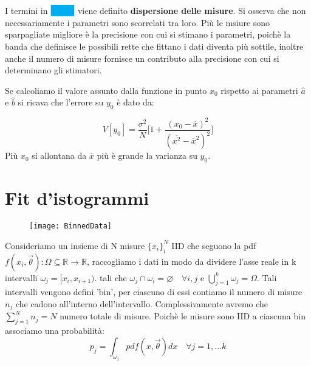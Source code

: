 I termini in $\colorbox{cyan}{\phantom{b = \,}}$ viene definito \textbf{dispersione delle misure}. Si osserva che non necessariamente i parametri sono scorrelati tra loro. Pi\`{u} le msiure sono sparpagliate migliore \`{e} la precisione con cui si stimano i parametri, poich\`{e} la banda che definisce le possibili rette che fittano i dati diventa pi\`{u} sottile, inoltre anche il numero di misure fornisce un contributo alla precisione con cui si determinano gli stimatori. \newline

\noindent Se calcoliamo il valore assunto dalla funzione in punto $x_0$ rispetto ai parametri $\hat{a}$ e $\hat{b}$ si ricava che l'errore su $y_0$ \`{e} dato da:

\begin{equation*}
	V[y_0] = \dfrac{\sigma^2}{N} \Big[ 1 + \dfrac{(x_0 - \overline{x})^2}{(\overline{x^2} - \overline{x}^2 )^2} \Big ]
\end{equation*}
Pi\`{u} $x_0$ si allontana da $\overline{x}$ pi\`{u} \`{e} grande la varianza su $y_0$.

\section{Fit d'istogrammi}
\begin{wrapfigure}{l}{0.\textwidth}
\centering
\texttt{[image: BinnedData]}	
\end{wrapfigure}
Consideriamo un insieme di N misure $\{x_{i}\}_i^N$ IID che seguono la pdf $f(x_i,\vec{\theta}): \Omega \subseteq \mathbb{R} \rightarrow \mathbb{R}$, raccogliamo i dati in modo da dividere l'asse reale in k intervalli $\omega_j = [x_i,x_{i+1})$. tali che $\omega_j \cap \omega_i = \varnothing \quad \forall i,j$ e $\bigcup_{j=1}^k \omega_j = \Omega$. Tali intervalli vengono defini 'bin', per ciascuno di essi contiamo il numero di misure $n_j$ che cadono all'interno dell'intervallo. Complessivamente avremo che $\sum_{j=1}^N n_j = N$ numero totale di misure. Poich\`{e} le misure sono IID a ciascuna bin associamo una probabilit\`{a}:
\begin{equation*}
	p_j = \int_{\omega_j}pdf(x,\vec{\theta})dx \quad \forall j =1,...k
\end{equation*} 

